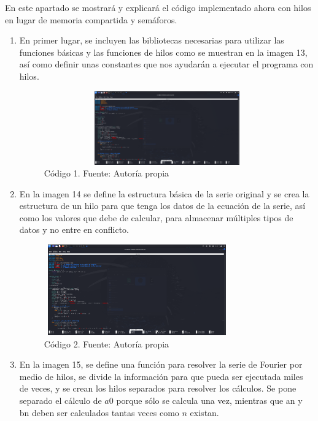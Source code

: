 En este apartado se mostrará y explicará el código implementado ahora con hilos en lugar de memoria compartida y semáforos.

\begin{enumerate} 
	\def\labelenumi{\arabic{enumi}.} 
	\item En primer lugar, se incluyen las bibliotecas necesarias para utilizar las funciones básicas y las funciones de hilos como se muestran en la imagen 13, así como definir unas constantes que nos ayudarán a ejecutar el programa con hilos.
	
	\begin{figure}[H]
		\centering
		\includegraphics[width=4.53385in,height=1.24967in]{media/image4.png}
		\caption{Código 1. Fuente: Autoría propia}
	\end{figure}
	
	\item En la imagen 14 se define la estructura básica de la serie original y se crea la estructura de un hilo para que tenga los datos de la ecuación de la serie, así como los valores que debe de calcular, para almacenar múltiples tipos de datos y no entre en conflicto.
	
	\begin{figure}[H]
		\centering
		\includegraphics[width=3.15in,height=1.54172in]{media/image4.png}
		\caption{Código 2. Fuente: Autoría propia}
	\end{figure}
	
	\item En la imagen 15, se define una función para resolver la serie de Fourier por medio de hilos, se divide la información para que pueda ser ejecutada miles de veces, y se crean los hilos separados para resolver los cálculos. Se pone separado el cálculo de \(a0\) porque sólo se calcula una vez, mientras que an y bn deben ser calculados tantas veces como \(n\) existan.
	

\end{enumerate}
